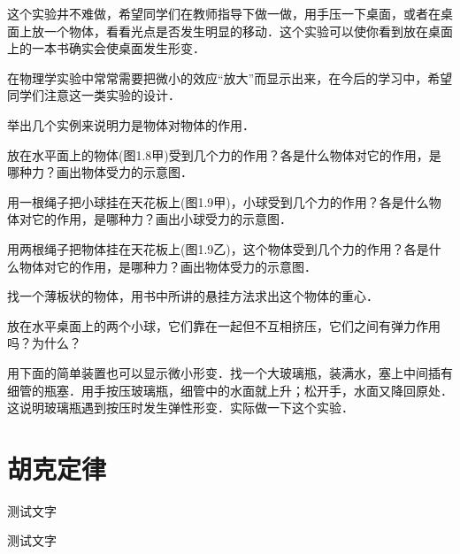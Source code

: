 \begin{Project}
\begin{Display}
这个实验井不难做，希望同学们在教师指导下做一做，用手压一下桌面，或者在桌面上放一个物体，看看光点是否发生明显的移动．这个实验可以使你看到放在桌面上的一本书确实会使桌面发生形变．

在物理学实验中常常需要把微小的效应“放大”而显示出来，在今后的学习中，希望同学们注意这一类实验的设计．

\end{Display}

\begin{Exercise}
	\begin{QsNum}
		\item{}举出几个实例来说明力是物体对物体的作用．
		\item{}放在水平面上的物体(图1.8甲)受到几个力的作用？各是什么物体对它的作用，是哪种力？画出物体受力的示意图．
		\item{}用一根绳子把小球挂在天花板上(图1.9甲)，小球受到几个力的作用？各是什么物体对它的作用，是哪种力？画出小球受力的示意图．
		\item{}用两根绳子把物体挂在天花板上(图1.9乙)，这个物体受到几个力的作用？各是什么物体对它的作用，是哪种力？画出物体受力的示意图．
		\item 找一个薄板状的物体，用书中所讲的悬挂方法求出这个物体的重心．
		\item 放在水平桌面上的两个小球，它们靠在一起但不互相挤压，它们之间有弹力作用吗？为什么？
		\item 用下面的简单装置也可以显示微小形变．找一个大玻璃瓶，装满水，塞上中间插有细管的瓶塞．用手按压玻璃瓶，细管中的水面就上升；松开手，水面又降回原处．这说明玻璃瓶遇到按压时发生弹性形变．实际做一下这个实验．
	\end{QsNum}
\end{Exercise}

\begin{Exercise}
	\zhlipsum[2]
\end{Exercise}


\end{Project}


\section{胡克定律}

\begin{Point*}
	测试文字
\end{Point*}

\begin{Case*}
	\item 测试文字
\end{Case*}



